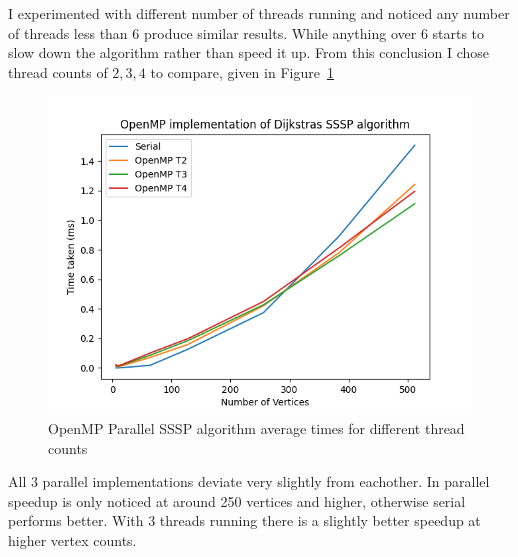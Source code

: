 	I experimented with different number of threads running and noticed any number of threads less than 6 produce similar results. While anything over 6 starts to slow down the algorithm rather than speed it up. From this conclusion I chose thread counts of $2,3,4$ to compare, given in Figure~\ref{fig:fig_sssp_omp}
	\begin{figure}[!htb]
		\centering
		\includegraphics[width=0.6\linewidth]{sssp_omp.png}
		\caption{OpenMP Parallel SSSP algorithm average times for different thread counts}
		\label{fig:fig_sssp_omp}
	\end{figure}

	All 3 parallel implementations deviate very slightly from eachother. In parallel speedup is only noticed at around 250 vertices and higher, otherwise serial performs better. With 3 threads running there is a slightly better speedup at higher vertex counts.
	
